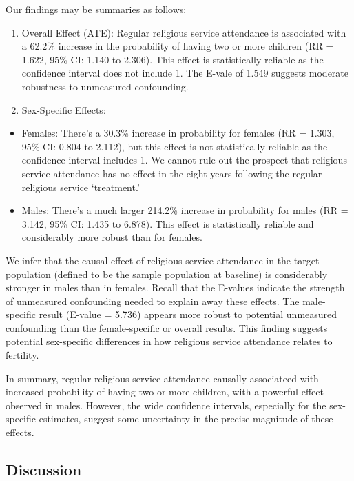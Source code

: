 \documentclass[
  single column]{article}
\providecommand{\tightlist}{%
  \setlength{\itemsep}{0pt}\setlength{\parskip}{0pt}}\usepackage{longtable,booktabs,array}
\begin{document}
\newpage{}

Our findings may be summaries as follows:

\begin{enumerate}
\def\labelenumi{\arabic{enumi}.}
\item
  Overall Effect (ATE): Regular religious service attendance is
  associated with a 62.2\% increase in the probability of having two or
  more children (RR = 1.622, 95\% CI: 1.140 to 2.306). This effect is
  statistically reliable as the confidence interval does not include 1.
  The E-vale of 1.549 suggests moderate robustness to unmeasured
  confounding.
\item
  Sex-Specific Effects:
\end{enumerate}

\begin{itemize}
\tightlist
\item
  Females: There's a 30.3\% increase in probability for females (RR =
  1.303, 95\% CI: 0.804 to 2.112), but this effect is not statistically
  reliable as the confidence interval includes 1. We cannot rule out the
  prospect that religious service attendance has no effect in the eight
  years following the regular religious service `treatment.'
\item
  Males: There's a much larger 214.2\% increase in probability for males
  (RR = 3.142, 95\% CI: 1.435 to 6.878). This effect is statistically
  reliable and considerably more robust than for females.
\end{itemize}

We infer that the causal effect of religious service attendance in the
target population (defined to be the sample population at baseline) is
considerably stronger in males than in females. Recall that the E-values
indicate the strength of unmeasured confounding needed to explain away
these effects. The male-specific result (E-value = 5.736) appears more
robust to potential unmeasured confounding than the female-specific or
overall results. This finding suggests potential sex-specific
differences in how religious service attendance relates to fertility.

In summary, regular religious service attendance causally associateed
with increased probability of having two or more children, with a
powerful effect observed in males. However, the wide confidence
intervals, especially for the sex-specific estimates, suggest some
uncertainty in the precise magnitude of these effects.

\subsection{Discussion}\label{discussion}
\end{document}
